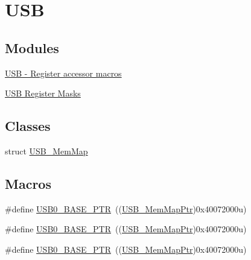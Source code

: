 \hypertarget{group___u_s_b___peripheral}{}\section{U\+SB}
\label{group___u_s_b___peripheral}
\subsection*{Modules}
\begin{DoxyCompactItemize}
\item 
\hyperlink{group___u_s_b___register___accessor___macros}{U\+S\+B -\/ Register accessor macros}
\item 
\hyperlink{group___u_s_b___register___masks}{U\+S\+B Register Masks}
\end{DoxyCompactItemize}
\subsection*{Classes}
\begin{DoxyCompactItemize}
\item 
struct \hyperlink{struct_u_s_b___mem_map}{U\+S\+B\+\_\+\+Mem\+Map}
\end{DoxyCompactItemize}
\subsection*{Macros}
\begin{DoxyCompactItemize}
\item 
\#define \hyperlink{group___u_s_b___peripheral_ga598ff5eb20a0551af232710b3f27640a}{U\+S\+B0\+\_\+\+B\+A\+S\+E\+\_\+\+P\+TR}~((\hyperlink{group___u_s_b___peripheral_gaabd989a49827dc34abb5de32732f4125}{U\+S\+B\+\_\+\+Mem\+Map\+Ptr})0x40072000u)
\item 
\#define \hyperlink{group___u_s_b___peripheral_ga598ff5eb20a0551af232710b3f27640a}{U\+S\+B0\+\_\+\+B\+A\+S\+E\+\_\+\+P\+TR}~((\hyperlink{group___u_s_b___peripheral_gaabd989a49827dc34abb5de32732f4125}{U\+S\+B\+\_\+\+Mem\+Map\+Ptr})0x40072000u)
\item 
\#define \hyperlink{group___u_s_b___peripheral_ga598ff5eb20a0551af232710b3f27640a}{U\+S\+B0\+\_\+\+B\+A\+S\+E\+\_\+\+P\+TR}~((\hyperlink{group___u_s_b___peripheral_gaabd989a49827dc34abb5de32732f4125}{U\+S\+B\+\_\+\+Mem\+Map\+Ptr})0x40072000u)
\end{DoxyCompactItemize}
